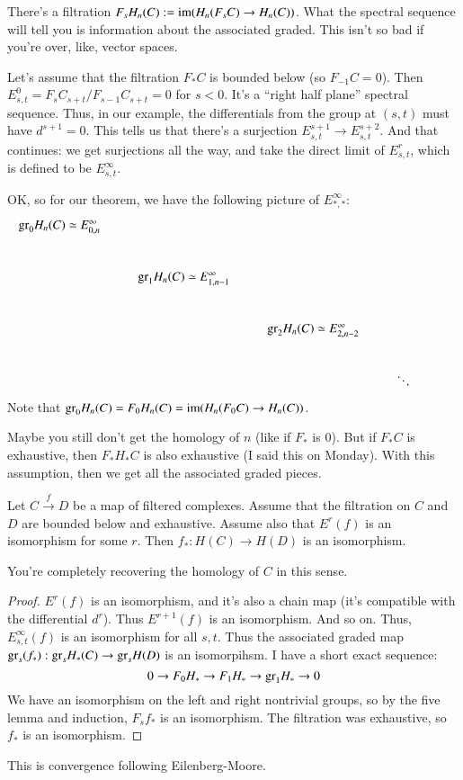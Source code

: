 There's a filtration $F_s H_n(C):=\operatorname{im}(H_n(F_s C) \to H_n(C))$.
What the spectral sequence will tell you is information about the associated graded.
This isn't so bad if you're over, like, vector spaces.

Let's assume that the filtration $F_\ast C$ is bounded below (so $F_{-1} C = 0$).
Then $E^0_{s,t} = F_s C_{s+t}/F_{s-1} C_{s+t} = 0$ for $s<0$.
It's a ``right half plane'' spectral sequence.
Thus, in our example, the differentials from the group at $(s,t)$ must have $d^{s+1} = 0$.
This tells us that there's a surjection $E^{s+1}_{s,t} \to E^{s+2}_{s,t}$.
And that continues: we get surjections all the way, and take the direct limit of $E^{r}_{s,t}$, which is defined to be $E^\infty_{s,t}$.

OK, so for our theorem, we have the following picture of $E^\infty_{\ast,\ast}$:
\begin{equation*}
    \xymatrix{
	\gr_0 H_n(C) \simeq E^\infty_{0,n} & & & \\
	& \gr_1 H_n(C) \simeq E^\infty_{1,n-1} & & \\
	& & \gr_2 H_n(C) \simeq E^\infty_{2,n-2} & & \\
	& & & \ddots
    }
\end{equation*}
Note that $\mathrm{gr}_0 H_n(C) = F_0 H_n(C) = \operatorname{im}(H_n(F_0 C) \to H_n(C))$.

Maybe you still don't get the homology of $n$ (like if $F_\ast$ is $0$).
But if $F_\ast C$ is exhaustive, then $F_\ast H_\ast C$ is also exhaustive (I said this on Monday).
With this assumption, then we get all the associated graded pieces.
\begin{corollary}
    Let $C\xrightarrow{f} D$ be a map of filtered complexes.
    Assume that the filtration on $C$ and $D$ are bounded below and exhaustive.
    Assume also that $E^r(f)$ is an isomorphism for some $r$.
    Then $f_\ast : H(C) \to H(D)$ is an isomorphism.
\end{corollary}
You're completely recovering the homology of $C$ in this sense.
\begin{proof}
    $E^r(f)$ is an isomorphism, and it's also a chain map (it's compatible with the differential $d^r$).
    Thus $E^{r+1}(f)$ is an isomorphism.
    And so on.
    Thus, $E^\infty_{s,t}(f)$ is an isomorphism for all $s,t$.
    Thus the associated graded map $\mathrm{gr}_s(f_\ast):\mathrm{gr}_s H_\ast(C) \to \mathrm{gr}_s H(D)$ is an isomorpihsm.
    I have a short exact sequence:
    $$
    0 \to F_0 H_\ast \to F_1 H_\ast \to \mathrm{gr}_1 H_\ast \to 0
    $$
    We have an isomorphism on the left and right nontrivial groups, so by the five lemma and induction, $F_s f_\ast$ is an isomorphism.
    The filtration was exhaustive, so $f_\ast$ is an isomorphism.
\end{proof}
This is convergence following Eilenberg-Moore.

